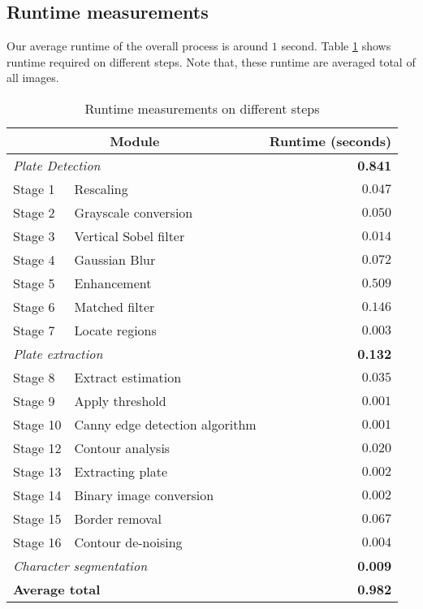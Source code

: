 
\subsection{Runtime measurements}
Our average runtime of the overall process is around $1$ second. Table \ref{table:Runtimes} shows runtime required on different steps. Note that, these runtime are averaged total of all images.


\begin{table}[!htb]
\centering
\caption{Runtime measurements on different steps}
\label{table:Runtimes}
\begin{tabular}{|l|l|r|}
\hline
\multicolumn{2}{|c|}{\bf Module}  & {\bf Runtime (seconds)} \\
\hline
\multicolumn{2}{|l|}{\it Plate Detection} & {\bf 0.841} \\ 
\hline
Stage 1 & Rescaling & $0.047$ \\
Stage 2 & Grayscale conversion & $0.050$ \\
Stage 3 & Vertical Sobel filter & $0.014$ \\
Stage 4 & Gaussian Blur & $0.072$ \\
Stage 5 & Enhancement & $0.509$ \\
Stage 6 & Matched filter & $0.146$ \\
Stage 7 & Locate regions & $0.003$ \\
\hline
\multicolumn{2}{|l|}{\it Plate extraction} & {\bf 0.132} \\ 
\hline
Stage 8 & Extract estimation & $0.035$ \\ 
Stage 9 & Apply threshold & $0.001$ \\ 
Stage 10 & Canny edge detection algorithm & $0.001$  \\ 
Stage 12 & Contour analysis & $0.020$ \\ 
Stage 13 & Extracting plate & $0.002$ \\ 
Stage 14 & Binary image conversion & $0.002$ \\ 
Stage 15 & Border removal & $0.067$ \\ 
Stage 16 & Contour de-noising & $0.004$ \\
\hline
\multicolumn{2}{|l|}{\it Character segmentation} & {\bf 0.009} \\ 
\hline
\multicolumn{2}{|l|}{\bf Average total} & {\bf 0.982} \\ 
\hline
\end{tabular}
\end{table} 


